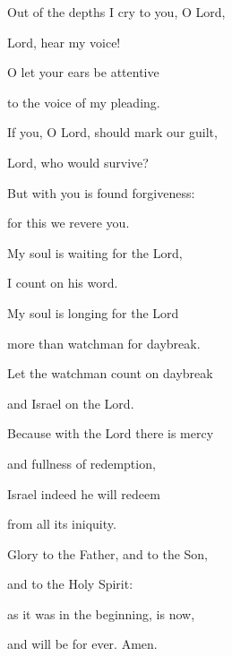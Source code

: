 \noindent Out of the depths I cry to you, O Lord,~\GreStar{}~\nopagebreak

Lord, hear my voice!

\noindent O let your ears be attentive~\GreStar{}~\nopagebreak

to the voice of my pleading.

\noindent If you, O Lord, should mark our guilt,~\GreStar{}~\nopagebreak

Lord, who would survive?

\noindent But with you is found forgiveness:~\GreStar{}~\nopagebreak

for this we revere you.

\noindent My soul is waiting for the Lord,~\GreStar{}~\nopagebreak

I count on his word.

\noindent My soul is longing for the Lord~\GreStar{}~\nopagebreak

more than watchman for daybreak.

\noindent Let the watchman count on daybreak~\GreStar{}~\nopagebreak

and Israel on the Lord.

\noindent Because with the Lord there is mercy~\GreStar{}~\nopagebreak

and fullness of redemption,

\noindent Israel indeed he will redeem~\GreStar{}~\nopagebreak

from all its iniquity.

\noindent Glory to the Father, and to the Son,~\GreStar{}~\nopagebreak

and to the Holy Spirit:

\noindent as it was in the beginning, is now,~\GreStar{}~\nopagebreak

and will be for ever. Amen.
